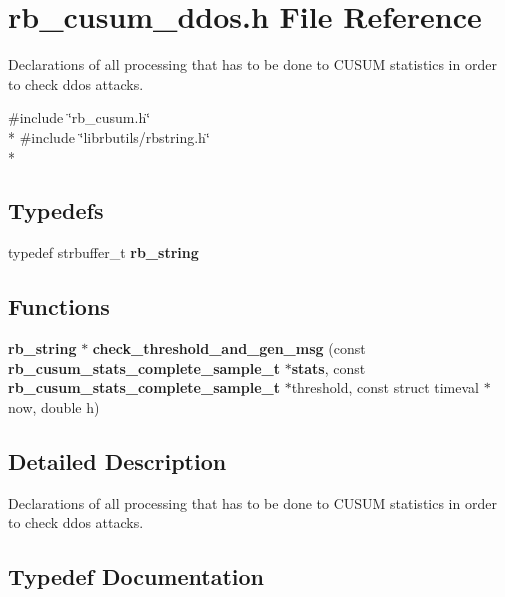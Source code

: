 \section{rb\+\_\+cusum\+\_\+ddos.\+h File Reference}
\label{rb__cusum__ddos_8h}


Declarations of all processing that has to be done to C\+U\+S\+U\+M statistics in order to check ddos attacks.  


{\ttfamily \#include \char`\"{}rb\+\_\+cusum.\+h\char`\"{}}\\*
{\ttfamily \#include \char`\"{}librbutils/rbstring.\+h\char`\"{}}\\*
\subsection*{Typedefs}
\begin{DoxyCompactItemize}
\item 
typedef strbuffer\+\_\+t {\bf rb\+\_\+string}
\end{DoxyCompactItemize}
\subsection*{Functions}
\begin{DoxyCompactItemize}
\item 
{\bf rb\+\_\+string} $\ast$ {\bf check\+\_\+threshold\+\_\+and\+\_\+gen\+\_\+msg} (const {\bf rb\+\_\+cusum\+\_\+stats\+\_\+complete\+\_\+sample\+\_\+t} $\ast${\bf stats}, const {\bf rb\+\_\+cusum\+\_\+stats\+\_\+complete\+\_\+sample\+\_\+t} $\ast$threshold, const struct timeval $\ast$now, double h)
\end{DoxyCompactItemize}


\subsection{Detailed Description}
Declarations of all processing that has to be done to C\+U\+S\+U\+M statistics in order to check ddos attacks. 



\subsection{Typedef Documentation}
